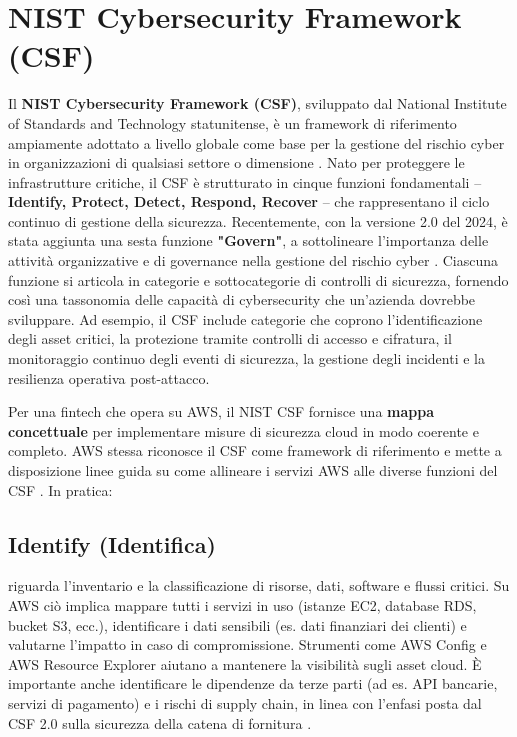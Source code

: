 \documentclass[a4paper,12pt]{report}
\begin{document}
\section{NIST Cybersecurity Framework (CSF)}
\label{sec:nist_csf}

Il \textbf{NIST Cybersecurity Framework (CSF)}, sviluppato dal National Institute of Standards and Technology statunitense, è un framework di riferimento ampiamente adottato a livello globale come base per la gestione del rischio cyber in organizzazioni di qualsiasi settore o dimensione \cite{awsNist}. Nato per proteggere le infrastrutture critiche, il CSF è strutturato in cinque funzioni fondamentali – \textbf{Identify, Protect, Detect, Respond, Recover} – che rappresentano il ciclo continuo di gestione della sicurezza. Recentemente, con la versione 2.0 del 2024, è stata aggiunta una sesta funzione \textbf{"Govern"}, a sottolineare l'importanza delle attività organizzative e di governance nella gestione del rischio cyber \cite{awsWhitepaper}. Ciascuna funzione si articola in categorie e sottocategorie di controlli di sicurezza, fornendo così una tassonomia delle capacità di cybersecurity che un'azienda dovrebbe sviluppare. Ad esempio, il CSF include categorie che coprono l'identificazione degli asset critici, la protezione tramite controlli di accesso e cifratura, il monitoraggio continuo degli eventi di sicurezza, la gestione degli incidenti e la resilienza operativa post-attacco.

Per una fintech che opera su AWS, il NIST CSF fornisce una \textbf{mappa concettuale} per implementare misure di sicurezza cloud in modo coerente e completo. AWS stessa riconosce il CSF come framework di riferimento e mette a disposizione linee guida su come allineare i servizi AWS alle diverse funzioni del CSF \cite{awsWhitepaper}. In pratica:

\subsection{Identify (Identifica)}
\label{subsec:nist_csf_identify}
riguarda l'inventario e la classificazione di risorse, dati, software e flussi critici. Su AWS ciò implica mappare tutti i servizi in uso (istanze EC2, database RDS, bucket S3, ecc.), identificare i dati sensibili (es. dati finanziari dei clienti) e valutarne l'impatto in caso di compromissione. Strumenti come AWS Config e AWS Resource Explorer aiutano a mantenere la visibilità sugli asset cloud. È importante anche identificare le dipendenze da terze parti (ad es. API bancarie, servizi di pagamento) e i rischi di supply chain, in linea con l'enfasi posta dal CSF 2.0 sulla sicurezza della catena di fornitura \cite{awsWhitepaper}.
\end{document}
